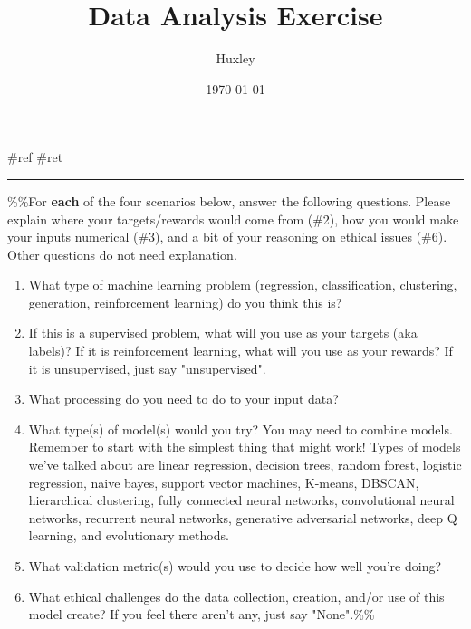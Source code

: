 \documentclass[letterpaper]{article}
\author{Huxley}
\date{\today}
\title{Data Analysis Exercise}
\renewcommand{\tableofcontents}{}
\begin{document}
\tableofcontents

\#ref \#ret

\noindent\rule{\textwidth}{0.5pt}

\%\%For \textbf{each} of the four scenarios below, answer the following
questions. Please explain where your targets/rewards would come from
(\#2), how you would make your inputs numerical (\#3), and a bit of your
reasoning on ethical issues (\#6). Other questions do not need
explanation.

\begin{enumerate}
\item What type of machine learning problem (regression, classification,
clustering, generation, reinforcement learning) do you think this is?
\item If this is a supervised problem, what will you use as your targets
(aka labels)? If it is reinforcement learning, what will you use as
your rewards? If it is unsupervised, just say "unsupervised".
\item What processing do you need to do to your input data?
\item What type(s) of model(s) would you try? You may need to combine
models. Remember to start with the simplest thing that might work!
Types of models we've talked about are linear regression, decision
trees, random forest, logistic regression, naive bayes, support
vector machines, K-means, DBSCAN, hierarchical clustering, fully
connected neural networks, convolutional neural networks, recurrent
neural networks, generative adversarial networks, deep Q learning,
and evolutionary methods.
\item What validation metric(s) would you use to decide how well you're
doing?
\item What ethical challenges do the data collection, creation, and/or use
of this model create? If you feel there aren't any, just say
"None".\%\%
\end{enumerate}
\end{document}
